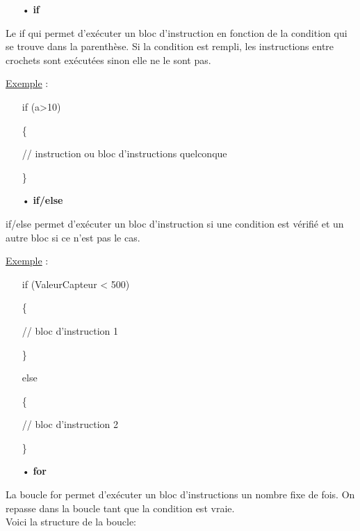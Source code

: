 \documentclass[12pt,a4paper]{article}
\begin{document}
\begin{itemize}
\bigskip
   \item[•] \Large{\textbf{if}
   }
\end{itemize}

Le if qui permet d’exécuter un bloc d’instruction en fonction de la condition qui se trouve dans la parenthèse. Si la condition est rempli, les instructions entre crochets sont exécutées sinon elle ne le sont pas.

\bigskip
\underline{Exemple} :


\begin{itemize}
     \item[] if (a>10)
    \item[]  \{
    \item[] // instruction ou bloc d’instructions quelconque
    \item[]  \}
\end{itemize}

\bigskip
\begin{itemize}
\bigskip
   \item[•] \Large{\textbf{if/else}}
\end{itemize}

if/else permet d’exécuter un bloc d’instruction si une condition est vérifié et un autre bloc si ce n’est pas le cas.

\bigskip
\underline{Exemple} :

\begin{itemize}
     \item[] if (ValeurCapteur < 500)
    \item[]  \{
    \item[] // bloc d'instruction 1
    \item[]  \}
    \item[] else
    \item[]  \{
    \item[] // bloc d'instruction 2
    \item[]  \}
\end{itemize}

\newpage
\begin{itemize}
\bigskip
   \item[•] \Large{\textbf{for}}
\end{itemize}

\bigskip
La boucle for permet d’exécuter un bloc d’instructions un nombre fixe de fois. On repasse dans la boucle tant que la condition est vraie. 
\\
Voici la structure de la boucle:
\end{document}
